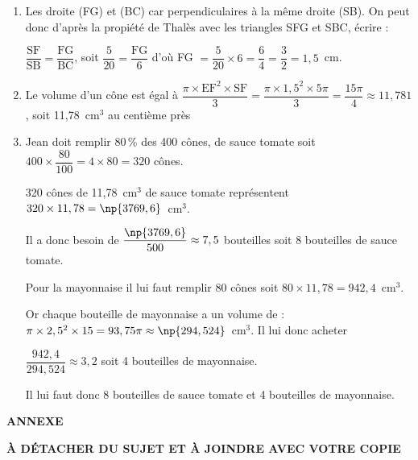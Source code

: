 \documentclass[10pt]{article}
\begin{document}
\begin{enumerate}
\item %
Les droite (FG) et (BC) car perpendiculaires à la même droite (SB). On peut donc d'après la propiété de Thalès avec les triangles SFG et SBC, écrire :

$\dfrac{\text{SF}}{\text{SB}} = \dfrac{\text{FG}}{\text{BC}} $, soit $\dfrac{5}{20} = \dfrac{\text{FG}}{6}$ d'où FG $= \dfrac{5}{20} \times 6 = \dfrac{6}{4} = \dfrac{3}{2} = 1,5$~cm.
\item %
Le volume d'un cône est égal à $\dfrac{\pi \times \text{EF}^2 \times \text{SF}}{3} =  \dfrac{\pi \times 1,5^2 \times 5\pi}{3} = \dfrac{15\pi}{4} \approx 11,781$, soit 11,78~cm$^3$ au centième près 
\item %
Jean doit remplir 80\,\% des 400 cônes, de sauce tomate soit $400 \times \dfrac{80}{100} = 4 \times 80 = 320$ cônes.

320 cônes de 11,78~cm$^3$ de sauce tomate représentent $320 \times 11,78 = \np{3769,6}$~cm$^3$. 

Il a donc besoin de $\dfrac{\np{3769,6}}{500} \approx 7,5$ bouteilles soit 8 bouteilles de sauce tomate.

Pour la mayonnaise il lui faut remplir 80 cônes soit $80 \times 11,78 = 942,4$~cm$^3$.

Or chaque bouteille de mayonnaise a un volume de : $\pi \times 2,5^2 \times 15 = 93,75\pi \approx \np{294,524}$~cm$^3$. Il lui donc acheter 

$\dfrac{942,4}{294,524} \approx 3,2$ soit 4 bouteilles de mayonnaise.

Il lui faut donc 8 bouteilles de sauce tomate et 4 bouteilles de mayonnaise.
\end{enumerate}

\medskip

%
%

\newpage

\begin{center}\textbf{\large ANNEXE}

\vspace{1cm} 

\textbf{À DÉTACHER DU SUJET ET À JOINDRE AVEC VOTRE COPIE }
\end{center}
\end{document}
